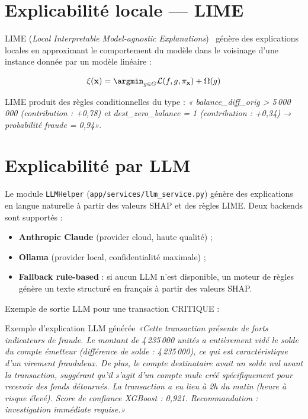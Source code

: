 \documentclass[12pt,a4paper,twoside]{report}
\theoremstyle{definition}
\begin{document}
\section{Explicabilité locale — LIME}

LIME (\textit{Local Interpretable Model-agnostic Explanations})~\cite{ribeiro2016why}
génère des explications locales en approximant le comportement du modèle dans le
voisinage d'une instance donnée par un modèle linéaire :

\begin{equation}
\xi(\mathbf{x}) = \argmin_{g \in G} \mathcal{L}(f, g, \pi_{\mathbf{x}}) + \Omega(g)
\label{eq:lime}
\end{equation}

LIME produit des règles conditionnelles du type : \textit{«
balance\_diff\_orig > 5\,000\,000 (contribution : +0,78)
et dest\_zero\_balance = 1 (contribution : +0,34)
→ probabilité fraude = 0,94»}.

\section{Explicabilité par LLM}

Le module \texttt{LLMHelper} (\texttt{app/services/llm\_service.py}) génère des
explications en langue naturelle à partir des valeurs SHAP et des règles LIME.
Deux backends sont supportés :
\begin{itemize}
  \item \textbf{Anthropic Claude} (provider cloud, haute qualité) ;
  \item \textbf{Ollama} (provider local, confidentialité maximale) ;
  \item \textbf{Fallback rule-based} : si aucun LLM n'est disponible, un moteur
    de règles génère un texte structuré en français à partir des valeurs SHAP.
\end{itemize}

Exemple de sortie LLM pour une transaction CRITIQUE :
\begin{pwcbox}{Exemple d'explication LLM générée}
\textit{«Cette transaction présente de forts indicateurs de fraude. Le montant de
4\,235\,000 unités a entièrement vidé le solde du compte émetteur (différence de
solde : 4\,235\,000), ce qui est caractéristique d'un virement frauduleux. De plus,
le compte destinataire avait un solde nul avant la transaction, suggérant qu'il s'agit
d'un compte mule créé spécifiquement pour recevoir des fonds détournés. La transaction
a eu lieu à 2h du matin (heure à risque élevé). Score de confiance XGBoost : 0,921.
Recommandation : investigation immédiate requise.»}
\end{pwcbox}
\end{document}
